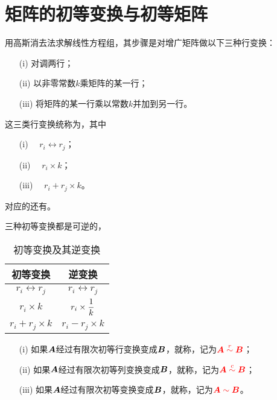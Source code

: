 \section{矩阵的初等变换与初等矩阵}

用高斯消去法求解线性方程组，其步骤是对增广矩阵做以下三种行变换：
\begin{itemize}
\item[(i)] 对调两行；
\item[(ii)] 以非零常数$k$乘矩阵的某一行；
\item[(iii)] 将矩阵的某一行乘以常数$k$并加到另一行。
\end{itemize}
这三类行变换统称为，其中
\begin{itemize}
\item[(i)]   $\quad r_i \leftrightarrow r_j$；
\item[(ii)]        $\quad r_i \times k$；
\item[(iii)]  $\quad r_i + r_j \times k $。
\end{itemize}
对应的还有。 


三种初等变换都是可逆的，
\begin{table}[htbp]
  \centering
  \begin{tabular}{|c|c|} \hline
    初等变换 &  逆变换 \\\hline
    $r_i \leftrightarrow r_j$ & $r_i \leftrightarrow r_j$ \\[0.2cm]\hline
    $r_i \times k$ & $\displaystyle r_i \times \frac1k$ \\[0.2cm]\hline
    $r_i + r_j \times k$ & $r_i - r_j\times k$ \\[0.2cm]\hline
  \end{tabular}
  \caption{初等变换及其逆变换}
\end{table}

\begin{dingyi}[矩阵的等价]
  
  \begin{itemize}
  \item[(i)] 如果$\boldsymbol{A}$经过有限次初等行变换变成$\boldsymbol{B}$，就称，记为$\textcolor{red}{\boldsymbol{A}\overset{r}{\sim} \boldsymbol{B}}$；
  \item[(ii)] 如果$\boldsymbol{A}$经过有限次初等列变换变成$\boldsymbol{B}$，就称，记为$\textcolor{red}{\boldsymbol{A}\overset{c}{\sim} \boldsymbol{B}}$；
  \item[(iii)] 如果$\boldsymbol{A}$经过有限次初等变换变成$\boldsymbol{B}$，就称，记为$\textcolor{red}{\boldsymbol{A}\sim \boldsymbol{B}}$。
  \end{itemize}
\end{dingyi}

